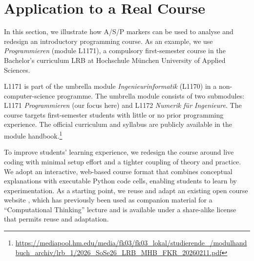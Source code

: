 \documentclass{article}
\begin{document}
\section{Application to a Real Course}
\label{sec:case-study}

In this section, we illustrate how A/S/P markers can be used to analyse and redesign an introductory programming course. As an example, we use \emph{Programmieren} (module L1171), a compulsory first-semester course in the Bachelor's curriculum LRB at Hochschule M\"unchen University of Applied Sciences.\par
L1171 is part of the umbrella module \emph{Ingenieurinformatik} (L1170) in a non-computer-science programme. The umbrella module consists of two submodules: L1171 \emph{Programmieren} (our focus here) and L1172 \emph{Numerik f\"ur Ingenieure}. The course targets first-semester students with little or no prior programming experience. The official curriculum and syllabus are publicly available in the module handbook.\footnote{\url{https://mediapool.hm.edu/media/fk03/fk03_lokal/studierende_/modulhandbuch_archiv/lrb_1/2026_SoSe26_LRB_MHB_FKR_20260211.pdf}}\par

To improve students' learning experience, we redesign the course around live coding with minimal setup effort and a tighter coupling of theory and practice. We adopt an interactive, web-based course format that combines conceptual explanations with executable Python code cells, enabling students to learn by experimentation. As a starting point, we reuse and adapt an existing open course website \citep{ZoennchenCTBook}, which has previously been used as companion material for a ``Computational Thinking'' lecture and is available under a share-alike license that permits reuse and adaptation.\par
\end{document}
